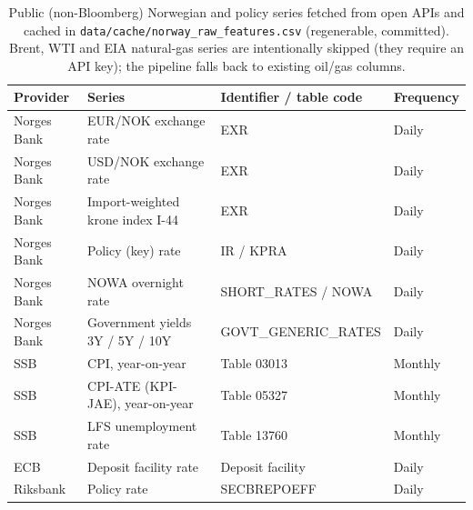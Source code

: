 \begin{table}[htbp]
\centering
\caption{Public (non-Bloomberg) Norwegian and policy series fetched from open APIs and cached in \texttt{data/cache/norway\_raw\_features.csv} (regenerable, committed). Brent, WTI and EIA natural-gas series are intentionally skipped (they require an API key); the pipeline falls back to existing oil/gas columns.}
\label{tab:app_public}
\footnotesize
\begin{tabular}{llll}
\toprule
Provider & Series & Identifier / table code & Frequency \\
\midrule
Norges Bank & EUR/NOK exchange rate & EXR & Daily \\
Norges Bank & USD/NOK exchange rate & EXR & Daily \\
Norges Bank & Import-weighted krone index I-44 & EXR & Daily \\
Norges Bank & Policy (key) rate & IR / KPRA & Daily \\
Norges Bank & NOWA overnight rate & SHORT\_RATES / NOWA & Daily \\
Norges Bank & Government yields 3Y / 5Y / 10Y & GOVT\_GENERIC\_RATES & Daily \\
SSB & CPI, year-on-year & Table 03013 & Monthly \\
SSB & CPI-ATE (KPI-JAE), year-on-year & Table 05327 & Monthly \\
SSB & LFS unemployment rate & Table 13760 & Monthly \\
ECB & Deposit facility rate & Deposit facility & Daily \\
Riksbank & Policy rate & SECBREPOEFF & Daily \\
\bottomrule
\end{tabular}
\end{table}
